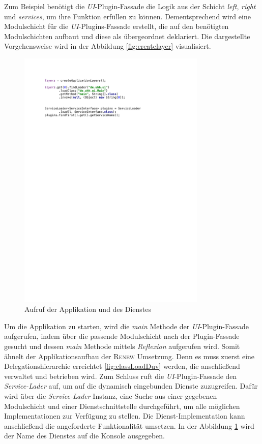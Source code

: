 	Zum Beispiel benötigt die \textit{UI}-Plugin-Fassade die Logik aus der Schicht \textit{left}, \textit{right} und \textit{services}, um ihre Funktion erfüllen zu können. Dementsprechend wird eine Modulschicht für die \textit{UI}-Plugins-Fassade erstellt, die auf den benötigten Modulschichten aufbaut und diese als übergeordnet deklariert. Die dargestellte Vorgehensweise wird in der Abbildung \ref{fig:createlayer} visualisiert.\newpage
	\begin{figure}[h!]
		   \centering
		   \captionsetup{justification=centering}
		   \includegraphics[width=0.8\textwidth]{material/images/umsetzung/main.pdf}
		    \caption{Aufruf der Applikation und des Dienstes}
		   \label{fig:figgi}
	\end{figure}
	Um die Applikation zu starten, wird die \textit{main} Methode der \textit{UI}-Plugin-Fassade aufgerufen, indem über die passende Modulschicht nach der Plugin-Fassade gesucht und dessen \textit{main} Methode mittels \textit{Reflexion} aufgerufen wird. Somit ähnelt der Applikationsaufbau der \textsc{Renew} Umsetzung. Denn es muss zuerst eine Delegationshierarchie erreichtet \ref{fig:classLoadDuv} werden, die anschließend verwaltet und betrieben wird. \newline
	Zum Schluss ruft die \textit{UI}-Plugin-Fassade den \textit{Service-Lader} auf, um auf die dynamisch eingebunden Dienste zuzugreifen. Dafür wird über die \textit{Service-Lader} Instanz, eine Suche aus einer gegebenen Modulschicht und einer Dienstschnittstelle durchgeführt, um alle möglichen Implementationen zur Verfügung zu stellen. Die Dienst-Implementation kann anschließend die angeforderte Funktionalität umsetzen. In der Abbildung \ref{fig:figgi} wird der Name des Dienstes auf die Konsole ausgegeben. \bigbreak 

